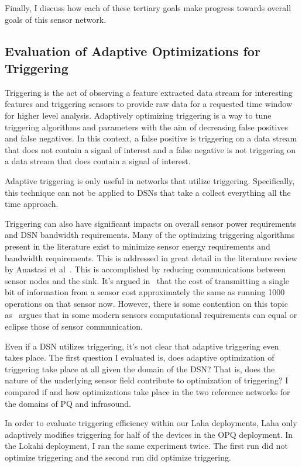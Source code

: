 Finally, I discuss how each of these tertiary goals make progress towards overall goals of this sensor network.

\subsection{Evaluation of Adaptive Optimizations for Triggering}\label{subsec:evaluation-of-adaptive-optimizations-for-triggering}
Triggering is the act of observing a feature extracted data stream for interesting features and triggering sensors to provide raw data for a requested time window for higher level analysis. Adaptively optimizing triggering is a way to tune triggering algorithms and parameters with the aim of decreasing false positives and false negatives. In this context, a false positive is triggering on a data stream that does not contain a signal of interest and a false negative is not triggering on a data stream that does contain a signal of interest.

Adaptive triggering is only useful in networks that utilize triggering. Specifically, this technique can not be applied to DSNs that take a collect everything all the time approach.

Triggering can also have significant impacts on overall sensor power requirements and DSN bandwidth requirements. Many of the optimizing triggering algorithms present in the literature exist to minimize sensor energy requirements and bandwidth requirements. This is addressed in great detail in the literature review by Anastasi et al~\cite{anastasi_energy_2009}. This is accomplished by reducing communications between sensor nodes and the sink. It's argued in~\cite{pottie2000wireless} that the cost of transmitting a single bit of information from a sensor cost approximately the same as running 1000 operations on that sensor now. However, there is some contention on this topic as~\cite{alippi_adaptive_2010} argues that in some modern sensors computational requirements can equal or eclipse those of  sensor communication.

Even if a DSN utilizes triggering, it's not clear that adaptive triggering even takes place. The first question I evaluated is, does adaptive optimization of triggering take place at all given the domain of the DSN? That is, does the nature of the underlying sensor field contribute to optimization of triggering? I compared if and how optimizations take place in the two reference networks for the domains of PQ and infrasound.

In order to evaluate triggering efficiency within our Laha deployments, Laha only adaptively modifies triggering for half of the devices in the OPQ deployment. In the Lokahi deployment, I  ran the same experiment twice. The first run did not optimize triggering and the second run did optimize triggering.

